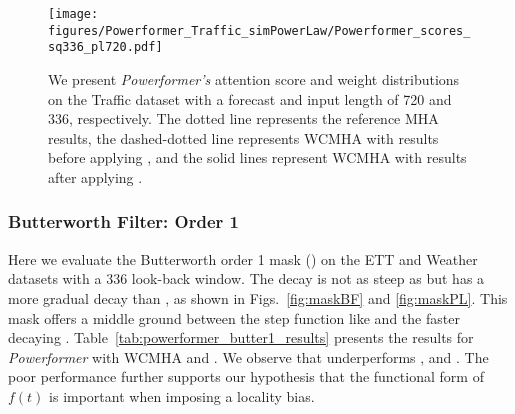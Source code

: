 \begin{figure*}[!ht]
    \centering
    \texttt{[image: figures/Powerformer\_Traffic\_simPowerLaw/Powerformer\_scores\_sq336\_pl720.pdf]}
    \caption{We present \emph{Powerformer's} attention score and weight distributions on the Traffic dataset with a forecast and input length of 720 and 336, respectively. The dotted line represents the reference MHA results, the dashed-dotted line represents WCMHA with \fspl{} results before applying \maskCL, and the solid lines represent WCMHA with \fspl{} results after applying \maskCL.}
    \label{fig:powerformer_traffic_720_simPowerLaw_attn_full}
\end{figure*}








\subsubsection{Butterworth Filter: Order 1}
\label{sm:experiments_powerformer_butter1}

Here we evaluate the Butterworth order 1 mask (\fbwo{}) on the ETT and Weather datasets with a 336 look-back window.
The \fbwo{} decay is not as steep as \fpl{} but has a more gradual decay than \fbwt, as shown in Figs.~\ref{fig:maskBF} and \ref{fig:maskPL}.
This mask offers a middle ground between the step function like \fbwt{} and the faster decaying \fpl.
Table~\ref{tab:powerformer_butter1_results} presents the results for \emph{Powerformer} with WCMHA and \fbwo.
We observe that \fbwo{} underperforms  \fpl, \fspl{} and \fbwt.
The poor performance further supports our hypothesis that the functional form of $f(t)$ is important when imposing a locality bias.


